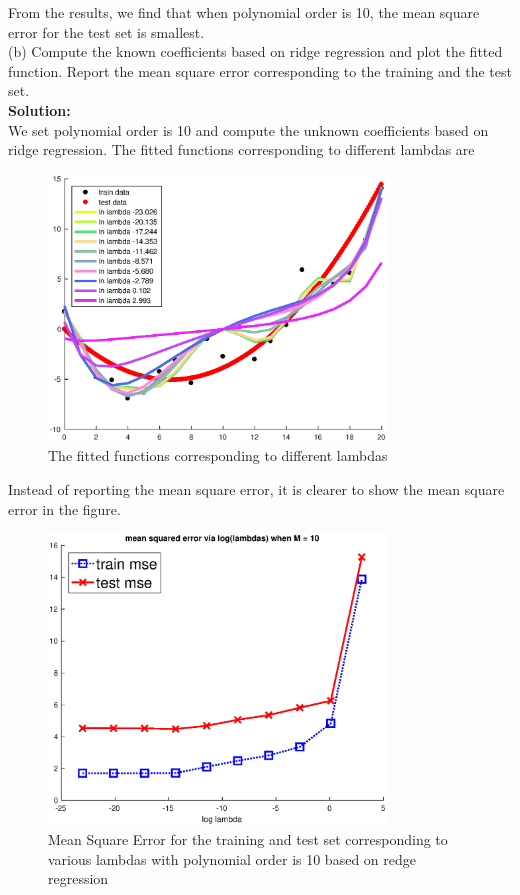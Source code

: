 \documentclass{article}
\newcommand{\widefigurewidth}{0.8\textwidth}
\begin{document}
From the results, we find that when polynomial order is 10, the mean square error for the test set is smallest.\\
(b) Compute the known coefficients based on ridge regression and plot the fitted function. Report the mean square error corresponding to the training and the test set.\\
\textbf{Solution:}\\
We set  polynomial order is 10 and compute the unknown coefficients based on ridge regression.
The fitted functions corresponding to different lambdas are
\begin{figure}[h!]
\centering
\includegraphics[width=\widefigurewidth]{fig/P6db1.eps}
\caption{The fitted functions corresponding to different lambdas}
\end{figure}
Instead of reporting the mean square error, it is clearer to show the mean square error in the figure.
\begin{figure}[h!]
\centering
\includegraphics[width=\widefigurewidth]{fig/P6db.eps}
\caption{Mean Square Error for the training and test set corresponding to various lambdas with polynomial order is 10 based on redge regression}
\end{figure} \\
\end{document}
